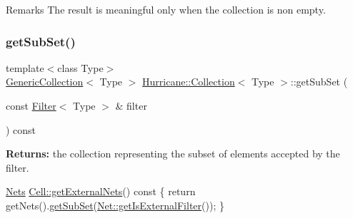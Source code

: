\begin{DoxyRemark}{Remarks}
The result is meaningful only when the collection is non empty. 
\end{DoxyRemark}
\mbox{\label{classHurricane_1_1Collection_aa32ea7249d57ee05e3c71dcde8106832}} 
\subsubsection{\texorpdfstring{get\+Sub\+Set()}{getSubSet()}\hspace{0.1cm}{\footnotesize\ttfamily [1/3]}}
{\footnotesize\ttfamily template$<$class Type$>$ \\
\mbox{\hyperlink{classHurricane_1_1GenericCollection}{Generic\+Collection}}$<$ Type $>$ \mbox{\hyperlink{classHurricane_1_1Collection}{Hurricane\+::\+Collection}}$<$ Type $>$\+::get\+Sub\+Set (\begin{DoxyParamCaption}\item[{const \mbox{\hyperlink{classHurricane_1_1Filter}{Filter}}$<$ Type $>$ \&}]{filter }\end{DoxyParamCaption}) const\hspace{0.3cm}{\ttfamily [inline]}}

{\bfseries Returns\+:} the collection representing the subset of elements accepted by the filter. 
\begin{DoxyCode}
\mbox{\hyperlink{namespaceHurricane_a3404a8b17130a1824f4a281704b04df7}{Nets}} \mbox{\hyperlink{classHurricane_1_1Cell_aa80f3345db8c1395fa04a50737208793}{Cell::getExternalNets}}()\textcolor{keyword}{ const}
\textcolor{keyword}{}\{
   \textcolor{keywordflow}{return} getNets().\mbox{\hyperlink{classHurricane_1_1Collection_aa32ea7249d57ee05e3c71dcde8106832}{getSubSet}}(\mbox{\hyperlink{classHurricane_1_1Net_a3af91a80e219e37e70229e61dfd385da}{Net::getIsExternalFilter}}());
\}
\end{DoxyCode}
 \mbox{\label{classHurricane_1_1Collection_a91d986e21395d4021d927e06f204ab6c}} 
